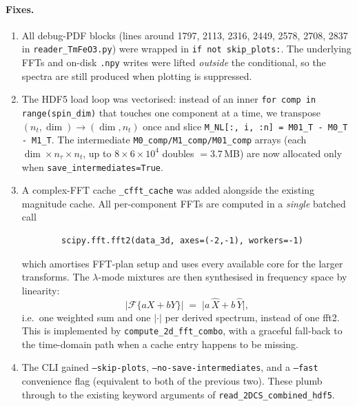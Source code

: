 \documentclass[11pt,letterpaper]{article}
\begin{document}
\paragraph{Fixes.}
\begin{enumerate}[noitemsep,leftmargin=*]
  \item All debug-PDF blocks (lines around 1797, 2113, 2316, 2449,
        2578, 2708, 2837 in
        \texttt{reader\_TmFeO3.py}) were wrapped in
        \texttt{if not skip\_plots:}.  The underlying FFTs and
        on-disk \texttt{.npy} writes were lifted \emph{outside}
        the conditional, so the spectra are still produced when
        plotting is suppressed.
  \item The HDF5 load loop was vectorised: instead of an inner
        \texttt{for comp in range(spin\_dim)} that touches one
        component at a time, we transpose
        $(n_t,\dim)\to(\dim,n_t)$ once and slice
        \texttt{M\_NL[:, i, :n] = M01\_T - M0\_T - M1\_T}.
        The intermediate \texttt{M0\_comp/M1\_comp/M01\_comp}
        arrays (each $\dim\times n_\tau\times n_t$, up to
        $8\times 6\times 10^4$ doubles
        $= 3.7\,$MB) are now allocated only when
        \texttt{save\_intermediates=True}.
  \item A complex-FFT cache \texttt{\_cfft\_cache} was added
        alongside the existing magnitude cache.  All per-component
        FFTs are computed in a \emph{single} batched call
        \begin{verbatim}
        scipy.fft.fft2(data_3d, axes=(-2,-1), workers=-1)
        \end{verbatim}
        which amortises FFT-plan setup and uses every available
        core for the larger transforms.  The $\lambda$-mode
        mixtures are then synthesised in frequency space by
        linearity:
        \[
            \lvert \mathcal F\{aX+bY\}\rvert
            \;=\; \lvert a\,\hat X + b\,\hat Y \rvert ,
        \]
        i.e.\ one weighted sum and one $\lvert\cdot\rvert$ per
        derived spectrum, instead of one fft2.  This is
        implemented by \texttt{compute\_2d\_fft\_combo}, with a
        graceful fall-back to the time-domain path when
        a cache entry happens to be missing.
  \item The CLI gained \texttt{--skip-plots},
        \texttt{--no-save-intermediates}, and a
        \texttt{--fast} convenience flag (equivalent to both
        of the previous two).  These plumb through to the
        existing keyword arguments of
        \texttt{read\_2DCS\_combined\_hdf5}.
\end{enumerate}
\end{document}
